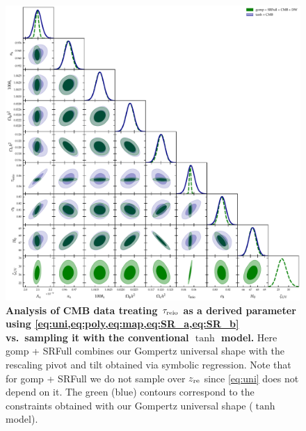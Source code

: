 \begin{figure}[t]
\centering
\includegraphics[width=\linewidth]{figs/gomp1dw_tanh_triangle_kill_full.pdf}
\caption{\textbf{Analysis of CMB data treating $\tau_{\mathrm{reio}}$ as a derived
parameter using \cref{eq:uni,eq:poly,eq:map,eq:SR_a,eq:SR_b} vs.\ sampling it with
the conventional $\tanh$ model.} Here gomp + SRFull combines our Gompertz universal
shape with the rescaling pivot and tilt obtained via symbolic regression. Note that for
gomp + SRFull we do not sample over $z_{\mathrm{re}}$ since \cref{eq:uni} does not depend on it.
The green (blue) contours correspond to the constraints obtained with
our Gompertz universal shape ($\tanh$ model).}
\label{fig:unleashed_gomp}
\end{figure}


